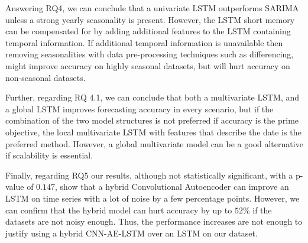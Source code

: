 Answering RQ4, we can conclude that a univariate LSTM outperforms SARIMA
unless a strong yearly seasonality is present. However, the LSTM short memory can be
compensated for by adding additional features to the LSTM containing temporal information.
If additional temporal information is unavailable then removing seasonalities with data pre-processing techniques such as differencing,
might improve accuracy on highly seasonal datasets, but will hurt accuracy on non-seasonal datasets.

Further, regarding RQ 4.1, we can conclude that both a multivariate LSTM,
and a global LSTM improves forecasting accuracy in every scenario, but if the combination
of the two model structures is not preferred if accuracy is the prime objective,
the local multivariate LSTM with features that describe the date is the preferred method.
However, a global multivariate model can be a good alternative if scalability is essential.

Finally, regarding RQ5  our results,
although not statistically significant, with a p-value of $0.147$,
show that a hybrid Convolutional Autoencoder can improve an LSTM on time series
with a lot of noise by a few percentage points.
However, we can confirm that the hybrid model can
hurt accuracy by up to $52\%$ if the datasets are not noisy enough.
Thus, the performance increases are not enough to justify using
a hybrid CNN-AE-LSTM over an LSTM on our dataset.



